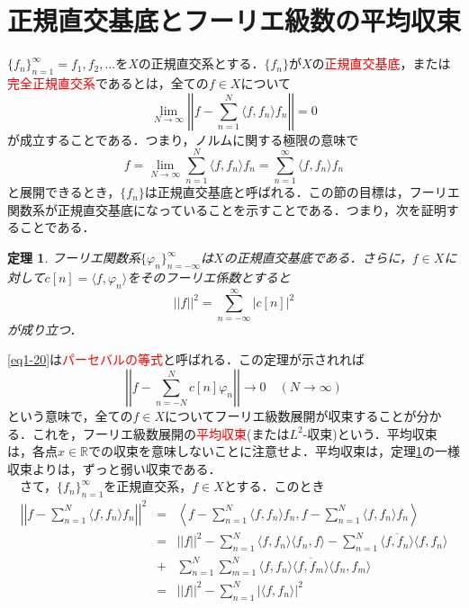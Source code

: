 \documentclass[a4j]{jsbook}
\newtheorem{theorem}{定理}
\numberwithin{theorem}{chapter}  %
\begin{document}
\section{正規直交基底とフーリエ級数の平均収束} \label{sec1-9}
\(\{f_n\}_{n=1}^\infty={f_1, f_2, \dots}\)を\(X\)の正規直交系とする．\(\{f_n\}\)が\(X\)の\textcolor{red}{正規直交基底}，または\textcolor{red}{完全正規直交系}であるとは，全ての\(f\in X\)について
\begin{equation*}
    \lim_{N\to\infty}\left|\left|f-\sum_{n=1}^N\langle f, f_n\rangle f_n\right|\right|=0
\end{equation*}
が成立することである．つまり，ノルムに関する極限の意味で
\begin{equation*}
    f=\lim_{N\to\infty}\sum_{n=1}^N \langle f, f_n\rangle f_n=\sum_{n=1}^\infty \langle f, f_n\rangle f_n
\end{equation*}
と展開できるとき，\(\{f_n\}\)は正規直交基底と呼ばれる．この節の目標は，フーリエ関数系が正規直交基底になっていることを示すことである．つまり，次を証明することである．
\begin{theorem}
\label{th1-6}
フーリエ関数系\(\{\varphi_n\}_{n=-\infty}^\infty\)は\(X\)の正規直交基底である．さらに，\(f\in X\)に対して\(c[n]=\langle f, \varphi_n\rangle\)をそのフーリエ係数とすると
\begin{equation}
    ||f||^2=\sum_{n=-\infty}^\infty |c[n]|^2 \label{eq1-20}
\end{equation}
が成り立つ．
\end{theorem}
\eqref{eq1-20}は\textcolor{red}{パーセバルの等式}と呼ばれる．この定理が示されれば
\begin{equation*}
    \left|\left|f-\sum_{n=-N}^N c[n]\varphi_n\right|\right|\to 0\quad (N\to\infty)
\end{equation*}
という意味で，全ての\(f\in X\)についてフーリエ級数展開が収束することが分かる．これを，フーリエ級数展開の\textcolor{red}{平均収束}(または\(L^2\)-収束)という．平均収束は，各点\(x\in\mathbb{R}\)での収束を意味しないことに注意せよ．平均収束は，定理\ref{th1-6}の一様収束よりは，ずっと弱い収束である．\\
　さて，\(\{f_n\}_{n=1}^\infty\)を正規直交系，\(f\in X\)とする．このとき
\begin{eqnarray}
\left|\left|f-\sum_{n=1}^N\langle f, f_n\rangle f_n\right|\right|^2&=&\left\langle f-\sum_{n=1}^N \langle f, f_n\rangle f_n, f-\sum_{n=1}^N \langle f, f_n\rangle f_n\right\rangle \nonumber \\
&=&||f||^2-\sum_{n=1}^N \langle f, f_n\rangle\langle f_n, f\rangle-\sum_{n=1}^N \overline{\langle f, f_n\rangle}\langle f, f_n\rangle \nonumber \\
&+&\sum_{n=1}^N\sum_{m=1}^N \langle f, f_n\rangle\overline{\langle f, f_m\rangle}\langle f_n, f_m\rangle \nonumber \\
&=&||f||^2-\sum_{n=1}^N |\langle f, f_n\rangle|^2 \label{eq1-21}
\end{eqnarray}
\end{document}
